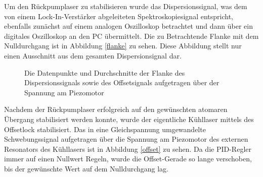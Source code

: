\documentclass[twoside,colorback,accentcolor=tud4c,11pt]{tudreport}
\begin{document}
Um den Rückpumplaser zu stabilisieren wurde das Dispersionssignal, was dem von einem Lock-In-Verstärker abgeleiteten Spektroskopiesignal entspricht, ebenfalls zunächst auf einem analogen Oszilloskop betrachtet und dann über ein digitales Oszilloskop an den PC übermittelt. Die zu Betrachtende Flanke mit dem Nulldurchgang ist in Abbildung \ref{flanke} zu sehen. Diese Abbildung stellt nur einen Ausschnitt aus dem gesamten Dispersionsignal dar.
\begin{figure}[H]
  \centering
  \quad
  \quad
  \caption{Die Datenpunkte und Durchschnitte der Flanke des Dispersionssignals sowie des Offsetsignals aufgetragen über der Spannung am Piezomotor}
  \label{fldis}
\end{figure}
Nachdem der Rückpumplaser erfolgreich auf den gewünschten atomaren Übergang stabilisiert werden konnte, wurde der eigentliche Kühllaser mittels des Offsetlock stabilisiert. Das in eine Gleichspannung umgewandelte Schwebungssignal aufgetragen über die Spannung am Piezomotor des externen Resonators des Kühllasers ist in Abbildung \ref{offset} zu sehen. Da die PID-Regler immer auf einen Nullwert Regeln, wurde die Offset-Gerade so lange verschoben, bis der gewünschte Wert auf dem Nulldurchgang lag.
\end{document}
